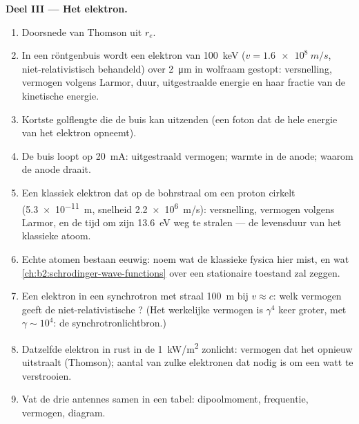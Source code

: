 \begin{problem}
\medskip
\noindent\textbf{Deel III --- Het elektron.}
\begin{enumerate}[resume]
  \item Doorsnede van Thomson uit $r_e$.
  \item In een röntgenbuis wordt een elektron van \qty{100}{keV}
        ($v = \qty{1.6e8}{m/s}$, niet-relativistisch behandeld) over
        \qty{2}{\micro m} in wolfraam gestopt: versnelling, vermogen volgens
        Larmor, duur, uitgestraalde energie en haar fractie van de
        kinetische energie.
  \item Kortste golflengte die de buis kan uitzenden (een foton dat de hele
        energie van het elektron opneemt).
  \item De buis loopt op \qty{20}{mA}: uitgestraald vermogen; warmte in de
        anode; waarom de anode draait.
  \item Een klassiek elektron dat op de bohrstraal om een proton cirkelt
        (\qty{5.3e-11}{m}, snelheid \qty{2.2e6}{m/s}): versnelling, vermogen
        volgens Larmor, en de tijd om zijn \qty{13.6}{eV} weg te stralen ---
        de levensduur van het klassieke atoom.
  \item Echte atomen bestaan eeuwig: noem wat de klassieke fysica hier mist,
        en wat \cref{ch:b2:schrodinger-wave-functions} over een stationaire
        toestand zal zeggen.
  \item Een elektron in een synchrotron met straal \qty{100}{m} bij
        $v \approx c$: welk vermogen geeft de niet-relativistische ? (Het werkelijke vermogen is $\gamma^4$ keer groter, met
        $\gamma \sim 10^4$: de synchrotronlichtbron.)
  \item Datzelfde elektron in rust in de \qty{1}{kW/m^2} zonlicht: vermogen
        dat het opnieuw uitstraalt (Thomson); aantal van zulke elektronen
        dat nodig is om een watt te verstrooien.
  \item Vat de drie antennes samen in een tabel: dipoolmoment, frequentie,
        vermogen, diagram.
\end{enumerate}
\end{problem}
